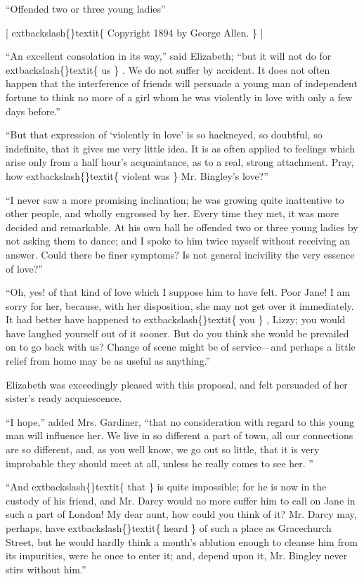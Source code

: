 \documentclass[10pt]{book}
\begin{document}
      “Offended two or three young ladies”
     

     [
     	extbackslash\{\}textit\{
      Copyright 1894 by George Allen.
     \}
     ]
    

   “An excellent consolation in its way,” said Elizabeth; “but it will not
do for
   	extbackslash\{\}textit\{
    us
   \}
   . We do not suffer by accident.
   It does not often happen
that the interference of friends will persuade a young man of
independent fortune to think no more of a girl whom he was violently in
love with only a few days before.”
  

   “But that expression of ‘violently in love’ is so hackneyed, so
doubtful, so indefinite, that it gives me very little idea. It is as
often applied to feelings which arise only from a half hour’s
acquaintance, as to a real, strong attachment. Pray, how
   	extbackslash\{\}textit\{
    violent was
   \}
   Mr. Bingley’s love?”
  

   “I never saw a more promising inclination; he was growing quite
inattentive to other people, and wholly engrossed by her. Every time
they met, it was more decided and remarkable. At his own ball he
offended two or three young ladies by not asking them to dance; and I
spoke to him twice myself without receiving an answer. Could there be
finer symptoms? Is not general incivility the very essence of love?”
  

   “Oh, yes! of that kind of love which I suppose him to have felt. Poor
Jane! I am sorry for her, because, with her disposition, she may not get
over it immediately. It had better have happened to
   	extbackslash\{\}textit\{
    you
   \}
   , Lizzy; you
would have laughed yourself out of it sooner. But do you think she would
be prevailed on to go back with us? Change of scene might be of
service—and perhaps a little relief from home may be as useful as
anything.”
  

   Elizabeth was exceedingly pleased with this proposal, and felt persuaded
of her sister’s ready acquiescence.
  

   “I hope,” added Mrs. Gardiner, “that no consideration with regard to
this young man will influence her. We live in so different a part of
town, all our connections are so different, and, as you well know, we go
out so little, that it is very improbable they should meet at all,
unless he really comes to see her.
   ”
  

   “And
   	extbackslash\{\}textit\{
    that
   \}
   is quite impossible; for he is now in the custody of his
friend, and Mr. Darcy would no more suffer him to call on Jane in such a
part of London! My dear aunt, how could you think of it? Mr. Darcy may,
perhaps, have
   	extbackslash\{\}textit\{
    heard
   \}
   of such a place as Gracechurch Street, but he
would hardly think a month’s ablution enough to cleanse him from its
impurities, were he once to enter it; and, depend upon it, Mr. Bingley
never stirs without him.”
  
\end{document}
